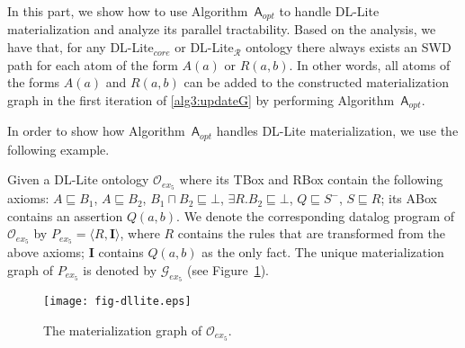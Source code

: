 \documentclass[final,1p,times]{elsarticle}
\begin{document}
In this part, we show how to use Algorithm~$\mathsf{A}_{opt}$ to handle
DL-Lite materialization and analyze its parallel tractability.
Based on the analysis, we have that, for any DL-Lite$_{core}$ or DL-Lite$_\mathcal{R}$ ontology
there always exists an SWD path for each atom of the form $A(a)$ or $R(a,b)$.
In other words, all atoms of the forms $A(a)$ and $R(a,b)$ can be added to
the constructed materialization graph in the first iteration of \ref{alg3:updateG}
by performing Algorithm~$\mathsf{A}_{opt}$.

In order to show how Algorithm~$\mathsf{A}_{opt}$ handles DL-Lite materialization,
we use the following example.

\begin{example}\label{exp:dllite}
Given a DL-Lite ontology $\mathcal{O}_{ex_5}$
where its TBox and RBox contain the following axioms:
$A\sqsubseteq B_1$, $A\sqsubseteq B_2$, $B_1\sqcap B_2\sqsubseteq\bot$,
$\exists R.B_2\sqsubseteq\bot$, $Q\sqsubseteq S^-$, $S\sqsubseteq R$;
its ABox contains an assertion $Q(a,b)$.
We denote the corresponding datalog program of $\mathcal{O}_{ex_5}$ by $P_{ex_5}=\langle R, \textbf{I}\rangle$,
where $R$ contains the rules that are transformed from the above axioms; $\textbf{I}$ contains $Q(a,b)$
as the only fact.
The unique materialization graph of $P_{ex_5}$ is denoted by $\mathcal{G}_{ex_5}$ (see Figure~\ref{fig:ex2}).
\end{example}

\begin{figure}[htbp]
\begin{center}
\texttt{[image: fig-dllite.eps]}
\caption{The materialization graph of $\mathcal{O}_{ex_5}$.}
\label{fig:ex2}
\end{center}
\end{figure}
\end{document}

